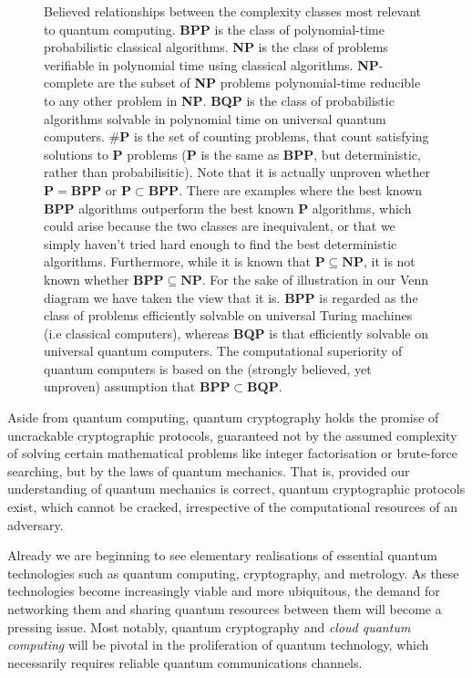 \documentclass[aps, rmp, twocolumn, amsmath, amssymb, nofootinbib, superscriptaddress, longbibliography, floatfix, table-of-contents, eqsecnum]{revtex4-1}
\begin{document}
\begin{figure}[!htb]
	\caption{Believed relationships between the complexity classes most relevant to quantum computing. \textbf{BPP} is the class of polynomial-time probabilistic classical algorithms. \textbf{NP} is the class of problems verifiable in polynomial time using classical algorithms. \textbf{NP}-complete are the subset of \textbf{NP} problems polynomial-time reducible to any other problem in \textbf{NP}. \textbf{BQP} is the class of probabilistic algorithms solvable in polynomial time on universal quantum computers. $\#\mathbf{P}$ is the set of counting problems, that count satisfying solutions to \textbf{P} problems (\textbf{P} is the same as \textbf{BPP}, but deterministic, rather than probabilisitic). Note that it is actually unproven whether \mbox{$\mathbf{P}=\mathbf{BPP}$} or \mbox{$\mathbf{P}\subset\mathbf{BPP}$}. There are examples where the best known \textbf{BPP} algorithms outperform the best known \textbf{P} algorithms, which could arise because the two classes are inequivalent, or that we simply haven't tried hard enough to find the best deterministic algorithms. Furthermore, while it is known that \mbox{$\mathbf{P}\subseteq\mathbf{NP}$}, it is not known whether \mbox{$\mathbf{BPP}\subseteq\mathbf{NP}$}. For the sake of illustration in our Venn diagram we have taken the view that it is. \textbf{BPP} is regarded as the class of problems efficiently solvable on universal Turing machines (i.e classical computers), whereas \textbf{BQP} is that efficiently solvable on universal quantum computers. The computational superiority of quantum computers is based on the (strongly believed, yet unproven) assumption that \mbox{$\mathbf{BPP}\subset\mathbf{BQP}$}.} \label{fig:complexity_classes}
\end{figure}

Aside from quantum computing, quantum cryptography holds the promise of uncrackable cryptographic protocols, guaranteed not by the assumed complexity of solving certain mathematical problems like integer factorisation or brute-force searching, but by the laws of quantum mechanics. That is, provided our understanding of quantum mechanics is correct, quantum cryptographic protocols exist, which cannot be cracked, irrespective of the computational resources of an adversary.

Already we are beginning to see elementary realisations of essential quantum technologies such as quantum computing, cryptography, and metrology. As these technologies become increasingly viable and more ubiquitous, the demand for networking them and sharing quantum resources between them will become a pressing issue. Most notably, quantum cryptography and \textit{cloud quantum computing} will be pivotal in the proliferation of quantum technology, which necessarily requires reliable quantum communications channels.
\end{document}
